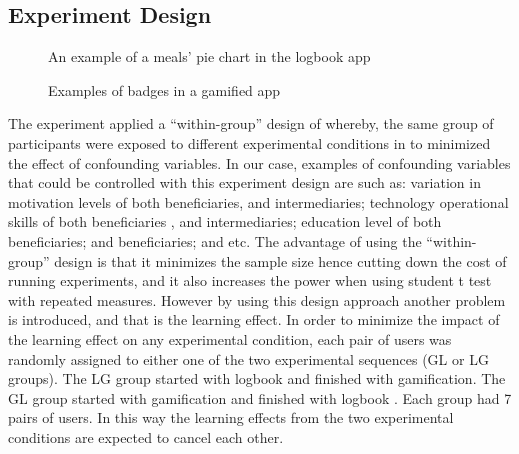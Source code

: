 \documentclass{sig-alternate}
\begin{document}
\subsection{Experiment Design}
\begin{figure}
\centering
{}
\caption{An example of a meals' pie chart in the logbook app}
\label{figure:logbookapp}
\end{figure}
\begin{figure}
\centering
{}
\caption{Examples of badges in a gamified app}
\label{figure:gameapp}
\end{figure}   
The experiment applied a ``within-group'' design of whereby, the same group of participants were exposed to different experimental conditions in to minimized the effect of confounding variables. In our case, examples of confounding variables that could be controlled with this experiment design are such as: variation in motivation levels of both beneficiaries, and intermediaries; technology operational skills of both beneficiaries , and intermediaries; education level of both beneficiaries; and beneficiaries; and etc. The advantage of using the ``within-group'' design is that it minimizes the sample size hence cutting down the cost of running experiments, and it also increases the power when using student t test with repeated measures. However by using this design approach another problem is introduced, and that is the learning effect. In order to minimize the impact of the learning effect on any experimental condition, each pair of users was randomly assigned to either one of the two experimental sequences (GL or LG groups). The LG group started with logbook and finished with gamification. The  GL group started with gamification and finished with logbook . Each group had 7 pairs of users. In this way the learning effects from the two experimental conditions are expected to cancel each other.  
\end{document}
